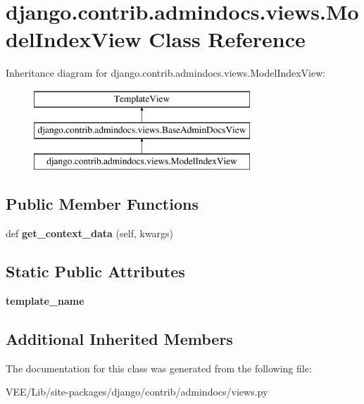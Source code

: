 \hypertarget{classdjango_1_1contrib_1_1admindocs_1_1views_1_1_model_index_view}{}\section{django.\+contrib.\+admindocs.\+views.\+Model\+Index\+View Class Reference}
\label{classdjango_1_1contrib_1_1admindocs_1_1views_1_1_model_index_view}
Inheritance diagram for django.\+contrib.\+admindocs.\+views.\+Model\+Index\+View\+:\begin{figure}[H]
\begin{center}
\leavevmode
\includegraphics[height=3.000000cm]{classdjango_1_1contrib_1_1admindocs_1_1views_1_1_model_index_view}
\end{center}
\end{figure}
\subsection*{Public Member Functions}
\begin{DoxyCompactItemize}
\item 
\mbox{\label{classdjango_1_1contrib_1_1admindocs_1_1views_1_1_model_index_view_a0713d9b649aba1de71b7262e6a0dd972}} 
def {\bfseries get\+\_\+context\+\_\+data} (self, kwargs)
\end{DoxyCompactItemize}
\subsection*{Static Public Attributes}
\begin{DoxyCompactItemize}
\item 
\mbox{\label{classdjango_1_1contrib_1_1admindocs_1_1views_1_1_model_index_view_a673acd8e22dd0ee5f585c1a5e6071019}} 
{\bfseries template\+\_\+name}
\end{DoxyCompactItemize}
\subsection*{Additional Inherited Members}


The documentation for this class was generated from the following file\+:\begin{DoxyCompactItemize}
\item 
V\+E\+E/\+Lib/site-\/packages/django/contrib/admindocs/views.\+py\end{DoxyCompactItemize}
